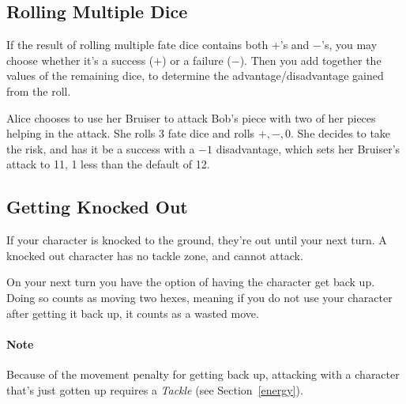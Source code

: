\subsection{Rolling Multiple Dice}\label{sec:multidice} If the result of rolling multiple fate dice contains both $+$'s and $-$'s, you may choose whether it's a success ($+$) or a failure ($-$).
Then you add together the values of the remaining dice, to determine the advantage/disadvantage gained from the roll.

\example Alice chooses to use her Bruiser to attack Bob's piece with two of her pieces helping in the attack.
She rolls 3 fate dice and rolls $+, -, 0$.
She decides to take the risk, and has it be a success with a $-1$ disadvantage, which sets her Bruiser's attack to 11, 1 less than the default of 12.

\subsection{Getting Knocked Out}\label{sec:knockout}
If your character is knocked to the ground, they're out until your next turn.
A knocked out character has no tackle zone, and cannot attack.

On your next turn you have the option of having the character get back up.
Doing so counts as moving two hexes, meaning if you do not use your character after getting it back up, it counts as a wasted move.

\paragraph{Note} Because of the movement penalty for getting back up, attacking with a character that's just gotten up requires a \textit{Tackle} (see Section~\ref{energy}).